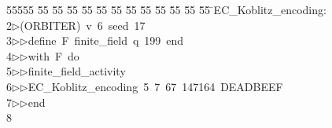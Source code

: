 %
%
\begin{tabbing}
55555 \= 55 \= 55 \= 55 \= 55 \= 55 \= 55 \= 55 \= 55 \= 55 \= 55 \= 55 \= 55 \= \>EC\_Koblitz\_encoding:\\[0pt]
2\>$\triangleright$\>(ORBITER)\ v\ 6\ seed\ 17\ \\[0pt]
3\>$\triangleright$\>$\triangleright$\>define\ F\ finite\_field\ q\ 199\ end\ \\[0pt]
4\>$\triangleright$\>$\triangleright$\>with\ F\ do\ \\[0pt]
5\>$\triangleright$\>$\triangleright$\>finite\_field\_activity\ \\[0pt]
6\>$\triangleright$\>$\triangleright$\>EC\_Koblitz\_encoding\ 5\ 7\ 67\ 147164\ DEADBEEF\ \\[0pt]
7\>$\triangleright$\>$\triangleright$\>end\\[0pt]
8\>\end{tabbing}

